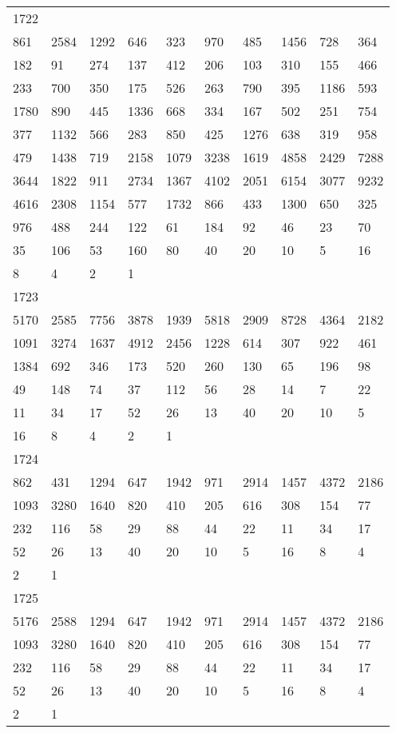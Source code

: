 \begin{longtable}{*{10}{l}}
1722&&&&&&&&&\\
861& 2584& 1292& 646& 323& 970& 485& 1456& 728& 364\\
182& 91& 274& 137& 412& 206& 103& 310& 155& 466\\
233& 700& 350& 175& 526& 263& 790& 395& 1186& 593\\
1780& 890& 445& 1336& 668& 334& 167& 502& 251& 754\\
377& 1132& 566& 283& 850& 425& 1276& 638& 319& 958\\
479& 1438& 719& 2158& 1079& 3238& 1619& 4858& 2429& 7288\\
3644& 1822& 911& 2734& 1367& 4102& 2051& 6154& 3077& 9232\\
4616& 2308& 1154& 577& 1732& 866& 433& 1300& 650& 325\\
976& 488& 244& 122& 61& 184& 92& 46& 23& 70\\
35& 106& 53& 160& 80& 40& 20& 10& 5& 16\\
8& 4& 2& 1& \\

1723&&&&&&&&&\\
5170& 2585& 7756& 3878& 1939& 5818& 2909& 8728& 4364& 2182\\
1091& 3274& 1637& 4912& 2456& 1228& 614& 307& 922& 461\\
1384& 692& 346& 173& 520& 260& 130& 65& 196& 98\\
49& 148& 74& 37& 112& 56& 28& 14& 7& 22\\
11& 34& 17& 52& 26& 13& 40& 20& 10& 5\\
16& 8& 4& 2& 1& \\

1724&&&&&&&&&\\
862& 431& 1294& 647& 1942& 971& 2914& 1457& 4372& 2186\\
1093& 3280& 1640& 820& 410& 205& 616& 308& 154& 77\\
232& 116& 58& 29& 88& 44& 22& 11& 34& 17\\
52& 26& 13& 40& 20& 10& 5& 16& 8& 4\\
2& 1& \\

1725&&&&&&&&&\\
5176& 2588& 1294& 647& 1942& 971& 2914& 1457& 4372& 2186\\
1093& 3280& 1640& 820& 410& 205& 616& 308& 154& 77\\
232& 116& 58& 29& 88& 44& 22& 11& 34& 17\\
52& 26& 13& 40& 20& 10& 5& 16& 8& 4\\
2& 1& \\


\end{longtable}

